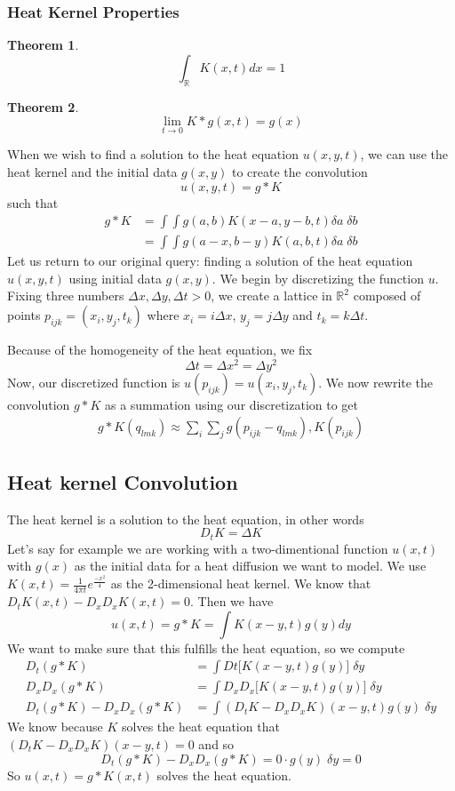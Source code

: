 \documentclass[12pt]{article}
\theoremstyle{plain}
\newtheorem{theorem}{Theorem}
\theoremstyle{definition}
\theoremstyle{remark}
\newcommand{\R}{\mathbb{R}}                %
\begin{document}
 \subsubsection{Heat Kernel Properties}
 \begin{theorem}
     $$\int_\R K(x, t) dx = 1$$
 \end{theorem}
 \begin{theorem}
     $$\lim_{t\rightarrow 0} K * g(x, t) = g(x)$$
 \end{theorem}
When we wish to find a solution to the heat equation  $u(x, y, t)$, we can use the heat kernel and the initial data $g(x, y)$ to create the convolution
$$u(x, y, t) = g * K$$ such that 
\begin{align*}
    g * K &= \int\int g(a, b) K(x-a, y-b, t) \delta a \; \delta b\\
    &=\int\int g(a-x, b-y) K(a, b, t) \delta a \; \delta b
\end{align*}
Let us return to our original query: finding a solution of the heat equation $u(x, y, t)$ using initial data $g(x, y)$. We begin by discretizing the function $u$. Fixing three numbers $\Delta x, \Delta y, \Delta t >0$, we create a lattice in $\mathbb{R}^2$ composed of points $p_{ijk}=(x_i, y_j, t_k)$ where $x_i=i \Delta x$, $y_j=j \Delta y$ and $t_k=k \Delta t$. 

Because of the homogeneity of the heat equation, we fix $$\Delta t= \Delta x^2 = \Delta y^2$$
Now, our discretized function is $u(p_{ijk})=u(x_i, y_j, t_k)$. We now rewrite the convolution $g *K$ as a summation using our discretization to get 
\begin{align*}
    g*K(q_{lmk}) \approx \sum_i \sum_j g(p_{ijk} -q_{lmk}), K(p_{ijk})  
\end{align*}

\subsection{Heat kernel Convolution}
The heat kernel is a solution to the heat equation, in other words $$D_t K=\Delta K$$
Let's say for example we are working with a two-dimentional function $u(x, t)$ with $g(x)$ as the initial data for a heat diffusion we want to model. We use $K(x, t) = \frac{1}{4\pi t} e^{\frac{-x^2}{4}}$ as the 2-dimensional heat kernel. We know that $D_t K(x, t)-D_xD_xK(x, t)=0$. Then we have $$u(x, t) = g*K=\int K(x-y, t)g(y) dy$$
We want to make sure that this fulfills the heat equation, so we compute \begin{align*}
    D_t(g*K)&=\int Dt\Big[K(x-y, t)g(y) \Big] \; \delta y\\
    D_xD_x(g*K)&=\int D_xD_x\Big[K(x-y, t)g(y) \Big] \; \delta y\\
    D_t(g*K)-D_xD_x(g*K)&=\int(D_tK-D_xD_xK)(x-y, t)g(y) \;\delta y
\end{align*}
We know because $K$ solves the heat equation that $(D_tK-D_xD_xK)(x-y, t) = 0$ and so $$D_t(g*K)-D_xD_x(g*K) = 0 \cdot g(y)\; \delta y = 0$$
So $u(x,t) = g*K(x, t)$ solves the heat equation.
\end{document}
